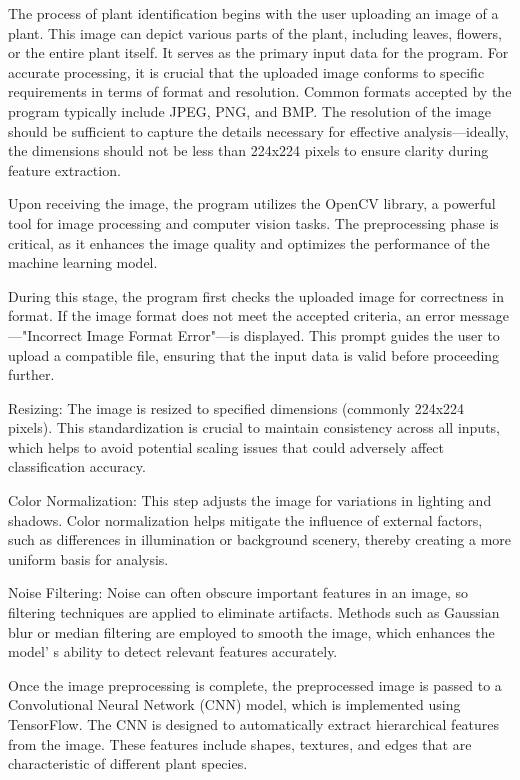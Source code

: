 \begin{multicols}{2}
The process of plant identification begins with the user uploading an
image of a plant. This image can depict various parts of the plant,
including leaves, flowers, or the entire plant itself. It serves as the
primary input data for the program. For accurate processing, it is
crucial that the uploaded image conforms to specific requirements in
terms of format and resolution. Common formats accepted by the program
typically include JPEG, PNG, and BMP. The resolution of the image should
be sufficient to capture the details necessary for effective
analysis---ideally, the dimensions should not be less than 224x224
pixels to ensure clarity during feature extraction.

Upon receiving the image, the program utilizes the OpenCV library, a
powerful tool for image processing and computer vision tasks. The
preprocessing phase is critical, as it enhances the image quality and
optimizes the performance of the machine learning model.

During this stage, the program first checks the uploaded image for
correctness in format. If the image format does not meet the accepted
criteria, an error message---"Incorrect Image Format Error"---is
displayed. This prompt guides the user to upload a compatible file,
ensuring that the input data is valid before proceeding further.

Resizing: The image is resized to specified dimensions (commonly 224x224
pixels). This standardization is crucial to maintain consistency across
all inputs, which helps to avoid potential scaling issues that could
adversely affect classification accuracy.

Color Normalization: This step adjusts the image for variations in
lighting and shadows. Color normalization helps mitigate the influence
of external factors, such as differences in illumination or background
scenery, thereby creating a more uniform basis for analysis.

Noise Filtering: Noise can often obscure important features in an image,
so filtering techniques are applied to eliminate artifacts. Methods such
as Gaussian blur or median filtering are employed to smooth the image,
which enhances the model' s ability to detect relevant
features accurately.

Once the image preprocessing is complete, the preprocessed image is
passed to a Convolutional Neural Network (CNN) model, which is
implemented using TensorFlow. The CNN is designed to automatically
extract hierarchical features from the image. These features include
shapes, textures, and edges that are characteristic of different plant
species.


\end{multicols}
